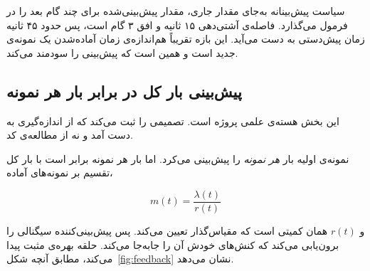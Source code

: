 سیاست پیش‌بینانه به‌جای مقدار جاری، مقدار پیش‌بینی‌شده برای چند گام بعد را در فرمول می‌گذارد.
فاصله‌ی آشتی‌دهی ۱۵ ثانیه و افق ۳ گام است، پس حدود ۴۵ ثانیه زمان پیش‌دستی به دست می‌آید. این
بازه تقریباً هم‌اندازه‌ی زمان آماده‌شدن یک نمونه‌ی جدید است و همین است که پیش‌بینی را سودمند
می‌کند.

\subsection{پیش‌بینی بار کل در برابر بار هر نمونه}
\label{sec:design-perreplica}

این بخش هسته‌ی علمی پروژه است. تصمیمی را ثبت می‌کند که از اندازه‌گیری به دست آمد و نه از
مطالعه‌ی کد.

نمونه‌ی اولیه بار \emph{هر نمونه} را پیش‌بینی می‌کرد. اما بار هر نمونه برابر است با بار کل
تقسیم بر نمونه‌های آماده،

\begin{equation}
\label{eq:perreplica}
m(t) = \frac{\lambda(t)}{r(t)}
\end{equation}

و $r(t)$ همان کمیتی است که مقیاس‌گذار تعیین می‌کند. پس پیش‌بینی‌کننده سیگنالی را برون‌یابی
می‌کند که کنش‌های خودش آن را جابه‌جا می‌کند. حلقه بهره‌ی مثبت پیدا می‌کند، مطابق آنچه
شکل~\ref{fig:feedback} نشان می‌دهد.

